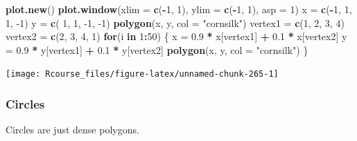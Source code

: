 \documentclass[]{book}
\newenvironment{Shaded}{\begin{snugshade}}{\end{snugshade}}
\newcommand{\ControlFlowTok}[1]{\textcolor[rgb]{0.13,0.29,0.53}{\textbf{#1}}}
\newcommand{\DataTypeTok}[1]{\textcolor[rgb]{0.13,0.29,0.53}{#1}}
\newcommand{\DecValTok}[1]{\textcolor[rgb]{0.00,0.00,0.81}{#1}}
\newcommand{\FloatTok}[1]{\textcolor[rgb]{0.00,0.00,0.81}{#1}}
\newcommand{\KeywordTok}[1]{\textcolor[rgb]{0.13,0.29,0.53}{\textbf{#1}}}
\newcommand{\NormalTok}[1]{#1}
\newcommand{\OperatorTok}[1]{\textcolor[rgb]{0.81,0.36,0.00}{\textbf{#1}}}
\newcommand{\StringTok}[1]{\textcolor[rgb]{0.31,0.60,0.02}{#1}}
\theoremstyle{definition}
\theoremstyle{definition}
\theoremstyle{definition}
\theoremstyle{remark}
\begin{document}
\begin{Shaded}
\begin{Highlighting}[]
\KeywordTok{plot.new}\NormalTok{()}
\KeywordTok{plot.window}\NormalTok{(}\DataTypeTok{xlim =} \KeywordTok{c}\NormalTok{(}\OperatorTok{-}\DecValTok{1}\NormalTok{, }\DecValTok{1}\NormalTok{), }\DataTypeTok{ylim =} \KeywordTok{c}\NormalTok{(}\OperatorTok{-}\DecValTok{1}\NormalTok{, }\DecValTok{1}\NormalTok{), }\DataTypeTok{asp =} \DecValTok{1}\NormalTok{)}
\NormalTok{x =}\StringTok{ }\KeywordTok{c}\NormalTok{(}\OperatorTok{-}\DecValTok{1}\NormalTok{, }\DecValTok{1}\NormalTok{, }\DecValTok{1}\NormalTok{, }\DecValTok{-1}\NormalTok{)}
\NormalTok{y =}\StringTok{ }\KeywordTok{c}\NormalTok{( }\DecValTok{1}\NormalTok{, }\DecValTok{1}\NormalTok{, }\DecValTok{-1}\NormalTok{, }\DecValTok{-1}\NormalTok{)}
\KeywordTok{polygon}\NormalTok{(x, y, }\DataTypeTok{col =} \StringTok{"cornsilk"}\NormalTok{)}
\NormalTok{vertex1 =}\StringTok{ }\KeywordTok{c}\NormalTok{(}\DecValTok{1}\NormalTok{, }\DecValTok{2}\NormalTok{, }\DecValTok{3}\NormalTok{, }\DecValTok{4}\NormalTok{)}
\NormalTok{vertex2 =}\StringTok{ }\KeywordTok{c}\NormalTok{(}\DecValTok{2}\NormalTok{, }\DecValTok{3}\NormalTok{, }\DecValTok{4}\NormalTok{, }\DecValTok{1}\NormalTok{)}
\ControlFlowTok{for}\NormalTok{(i }\ControlFlowTok{in} \DecValTok{1}\OperatorTok{:}\DecValTok{50}\NormalTok{) \{}
\NormalTok{    x =}\StringTok{ }\FloatTok{0.9} \OperatorTok{*}\StringTok{ }\NormalTok{x[vertex1] }\OperatorTok{+}\StringTok{ }\FloatTok{0.1} \OperatorTok{*}\StringTok{ }\NormalTok{x[vertex2]}
\NormalTok{    y =}\StringTok{ }\FloatTok{0.9} \OperatorTok{*}\StringTok{ }\NormalTok{y[vertex1] }\OperatorTok{+}\StringTok{ }\FloatTok{0.1} \OperatorTok{*}\StringTok{ }\NormalTok{y[vertex2]}
    \KeywordTok{polygon}\NormalTok{(x, y, }\DataTypeTok{col =} \StringTok{"cornsilk"}\NormalTok{)}
\NormalTok{\}}
\end{Highlighting}
\end{Shaded}

\texttt{[image: Rcourse\_files/figure-latex/unnamed-chunk-265-1]}

\hypertarget{circles}{%
\subsubsection{Circles}\label{circles}}

Circles are just dense polygons.
\end{document}
